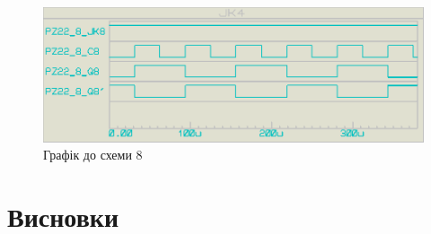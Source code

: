 \documentclass{article}
\begin{document}
\begin{normalsize}
	\begin{figure}[H]
		\centering
		\includegraphics[scale=0.25]{g8}	
		\caption{Графік до схеми 8}
	\end{figure}

	\section*{Висновки}
	
	    
\end{normalsize}
\end{document}
